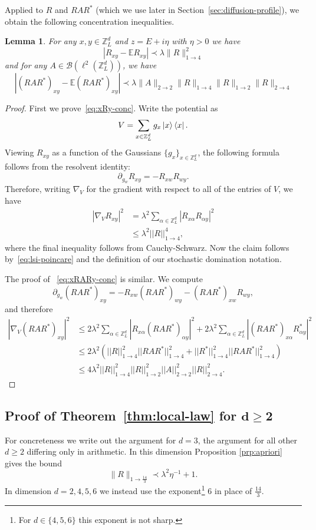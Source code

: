 \documentclass[11pt]{amsart}
\def\bbZ{{\mathbb Z}}
\def\bra#1{\mathinner{\langle{#1}|}}
\def\ket#1{\mathinner{|{#1}\rangle}}
\newcommand{\mcal}[1]{{\mathcal{#1}}}
\newcommand{\ldom}{\prec}
\numberwithin{equation}{section}
\numberwithin{theorem}{section}
\newtheorem{lemma}[theorem]{Lemma}
\begin{document}
Applied to $R$ and $RAR^*$ (which we use later in Section~\ref{sec:diffusion-profile}),
we obtain the following concentration inequalities.
\begin{lemma}
\label{lem:R-lsi}
For any $x,y\in\bbZ^d_L$ and $z=E+i\eta$ with $\eta>0$ we have
\begin{equation}
\label{eq:xRy-conc}
|R_{xy}-\mathbb{E}R_{xy}|\prec \lambda \|R\|_{1\to 4}^2
\end{equation}
and for any $A\in\mcal{B}(\ell^2(\bbZ^d_L))$, we have
\begin{equation}
\label{eq:xRARy-conc}
|(RAR^{\ast})_{xy} - \mathbb{E}(RAR^{\ast})_{xy}|\prec \lambda  \|A\|_{2\to 2} \|R\|_{1\to 4}
\|R\|_{1\to 2}
\|R\|_{2\to 4}
\end{equation}
\end{lemma}
\begin{proof}
First we prove~\eqref{eq:xRy-conc}.  Write the potential as
\[
V = \sum_{x\in\bbZ^d_L} g_x \ket{x}\bra{x}.
\]
Viewing $R_{xy}$ as a function of the Gaussians $\{g_x\}_{x\in\bbZ^d_L}$, the following formula follows from the resolvent identity:
\[
\partial_{g_w} R_{xy} = -R_{xw}R_{wy}.
\]
Therefore, writing $\nabla_V$ for the gradient with respect to all of the entries of $V$,
we have
\begin{align*}
|\nabla_{V} R_{xy}|^2
& = \lambda^2 \sum_{\alpha\in\bbZ^d_L} |R_{x\alpha}R_{\alpha y}|^2\\
& \leq \lambda^2 ||R||_{1\to 4}^4,
\end{align*}
where the final inequality follows from Cauchy-Schwarz.
Now the claim follows by~\eqref{eq:lsi-poincare} and the
definition of our stochastic domination notation.

The proof of ~\eqref{eq:xRARy-conc} is similar. We compute
\[
\partial_{g_w} (RAR^*)_{xy} = -R_{xw}(RAR^*)_{wy} - (RAR^*)_{xw}R_{wy},
\]
and therefore
\begin{align*}
|\nabla_{V} (RAR^*)_{xy}|^2
& \leq 2\lambda^2 \sum_{\alpha\in \mathbb{Z}^d_L}|R_{x\alpha}(RAR^*)_{\alpha y}|^2 + 2\lambda^2 \sum_{\alpha\in \mathbb{Z}^d_L}|(RAR^{\ast})_{x\alpha}R^{\ast}_{\alpha y}|^2 \\
& \leq 2\lambda^2 (||R||_{1\to 4}^2 ||RAR^{\ast}||_{1\to 4}^2 +  ||R^{\ast}||_{1\to 4}^2 ||RAR^{\ast}||_{1\to 4}^2)\\
& \leq 4\lambda^2||R||_{1\to 4}^2 ||R||_{1\to 2}^2 ||A||_{2\to 2}^2 ||R||_{2\to 4}^2.
\end{align*}
\end{proof}

\subsection{Proof of Theorem~\ref{thm:local-law} for $\mathbf{d\geq 2}$}
For concreteness we write out the argument for $d=3$, the argument for all other $d\geq 2$ differing only in arithmetic.
In this dimension Proposition \ref{prp:apriori} gives the bound
\[
\|R\|_{1\to \frac{14}{3}} \ldom \lambda^2\eta^{-1} + 1.
\]
In dimension $d=2,4,5,6$ we instead use the exponent\footnote{For $d\in\{4,5,6\}$ this exponent is not sharp.} $6$ in place of $\frac{14}{3}$.
\end{document}
